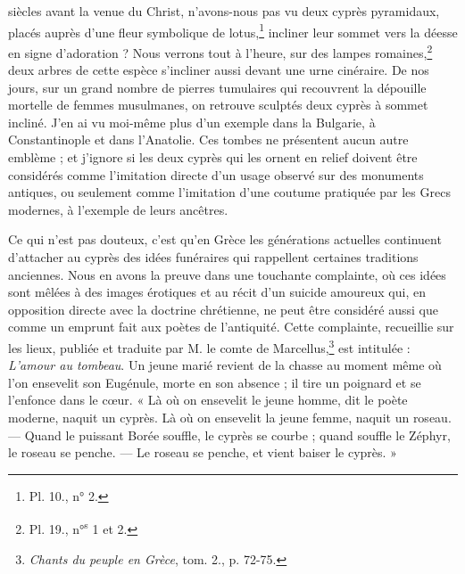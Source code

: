 \documentclass{article}
\begin{document}
siècles avant la venue du Christ, n'avons-nous pas vu deux cyprès pyramidaux, placés auprès d'une fleur symbolique de lotus,\footnote{Pl. 10., n° 2.} incliner leur sommet vers la déesse en signe d'adoration ? Nous verrons tout à l'heure, sur des lampes romaines,\footnote{Pl. 19., n°\textsuperscript{s} 1 et 2.} deux arbres de cette espèce s'incliner aussi devant une urne cinéraire. De nos jours, sur un grand nombre de pierres tumulaires qui recouvrent la dépouille mortelle de femmes musulmanes, on retrouve sculptés deux cyprès à sommet incliné. J'en ai vu moi-même plus d'un exemple dans la Bulgarie, à Constantinople et dans l'Anatolie. Ces tombes ne présentent aucun autre emblème ; et j'ignore si les deux cyprès qui les ornent en relief doivent être considérés comme l'imitation directe d'un usage observé sur des monuments antiques, ou seulement comme l'imitation d'une coutume pratiquée par les Grecs modernes, à l'exemple de leurs ancêtres.

Ce qui n'est pas douteux, c'est qu'en Grèce les générations actuelles continuent d'attacher au cyprès des idées funéraires qui rappellent certaines traditions anciennes. Nous en avons la preuve dans une touchante complainte, où ces idées sont mêlées à des images érotiques et au récit d'un suicide amoureux qui, en opposition directe avec la doctrine chrétienne, ne peut être considéré aussi que comme un emprunt fait aux poètes de l'antiquité. Cette complainte, recueillie sur les lieux, publiée et traduite par M. le comte de Marcellus,\footnote{\emph{Chants du peuple en Grèce}, tom. 2., p. 72-75.} est intitulée : \emph{L'amour au tombeau}. Un jeune marié revient de la chasse au moment même où l'on ensevelit son Eugénule, morte en son absence ; il tire un poignard et se l'enfonce dans le cœur. « Là où on ensevelit le jeune homme, dit le poète moderne, naquit un cyprès. Là où on ensevelit la jeune femme, naquit un roseau. --- Quand le puissant Borée souffle, le cyprès se courbe ; quand souffle le Zéphyr, le roseau se penche. --- Le roseau se penche, et vient baiser le cyprès. »
\end{document}
